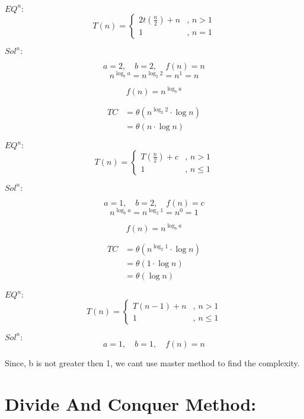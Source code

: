 \documentclass{article}
\begin{document}
$EQ^n:$
\[
    T(n) = 
    \begin{cases}
        2t\left(\frac{n}{2}\right) + n & \text{, } n > 1 \\
        1 & \text{, } n = 1
    \end{cases}
\]

$Sol^n:$

\[
    a = 2, \quad b = 2, \quad f(n) = n
\]
\[
    n^{\log_b a} = n^{\log_2 2} = n^1 = n
\]

\[
    f(n) = n^{\log_b a}
\]

\begin{align*}
    TC &= \theta (n^{\log_2 2} \cdot \log n) \\
       &= \theta (n \cdot \log n) 
\end{align*}

\hrulefill
\vspace*{10pt}


$EQ^n:$
\[
    T(n) = 
    \begin{cases}
        T\left(\frac{n}{2}\right) + c & \text{, } n > 1 \\
        1 & \text{, } n \leq 1
    \end{cases}
\]

$Sol^n:$

\[
    a = 1, \quad b = 2, \quad f(n) = c
\]
\[
    n^{\log_b a} = n^{\log_2 1} = n^0 = 1
\]

\[
    f(n) = n^{\log_b a}
\]

\begin{align*}
    TC &= \theta (n^{\log_2 1} \cdot \log n) \\
       &= \theta (1 \cdot \log n)\\
       &= \theta (\log n)
\end{align*}

\hrulefill
\vspace*{10pt}

$EQ^n:$
\[
    T(n) = 
    \begin{cases}
        T\left({n-1}\right) + n & \text{, } n > 1 \\
        1 & \text{, } n \leq 1
    \end{cases}
\]

$Sol^n:$
\[
    a = 1, \quad b = 1, \quad f(n) = n
\]  

Since, b is not greater then 1, we cant use master method to find the complexity.

\hrulefill
\newpage

\section*{Divide And Conquer Method:}
\end{document}
